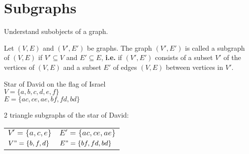 \documentclass[10pt]{article}
\begin{document}
	\section{Subgraphs}
	\begin{description}
		\item[Task:] Understand subobjects of a graph.
		\item[Definition:] Let $(V, E)$ and $(V', E')$ be graphs. The graph $(V', E')$ is called a subgraph of $(V, E)$ if $V' \subseteq V$ and $E' \subseteq E$, \textbf{i.e.} if $(V', E')$ consists of a subset $V'$ of the vertices of $(V, E)$ and a subset $E'$ of edges $(V, E)$ between vertices in $V'$.
		\item[Example:] Star of David on the flag of Israel \\
			$V = \{a, b, c, d, e, f\}$ \\
			$E = \{ac, ce, ae, bf, fd, bd\}$ \\
			\begin{figure}[h!]
				\centering
		\end{figure}
		\item 2 triangle subgraphs of the star of David: \\
		\begin{tabular}{ll}
				$V' = \{a, c, e\}$ & $E' = \{ac, ce, ae\}$ \\
				$V" = \{b, f, d\}$ & $E" = \{bf, fd, bd\}$
		\end{tabular}
	\end{description}
	
\end{document}
